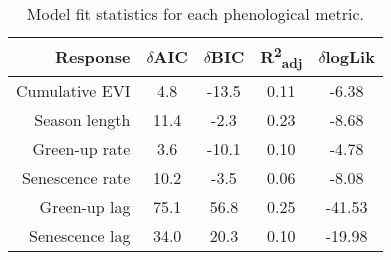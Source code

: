 \begin{table}[h]
\centering
\begin{tabular}{rcccc}
  \hline
Response & $\delta$AIC & $\delta$BIC & R\textsuperscript{2}\textsubscript{adj} & $\delta$logLik \\ 
  \hline
Cumulative EVI & 4.8 & -13.5 & 0.11 & -6.38 \\ 
  Season length & 11.4 & -2.3 & 0.23 & -8.68 \\ 
  Green-up rate & 3.6 & -10.1 & 0.10 & -4.78 \\ 
  Senescence rate & 10.2 & -3.5 & 0.06 & -8.08 \\ 
  Green-up lag & 75.1 & 56.8 & 0.25 & -41.53 \\ 
  Senescence lag & 34.0 & 20.3 & 0.10 & -19.98 \\ 
   \hline
\end{tabular}
\caption{Model fit statistics for each phenological metric.} 
\label{mod_stat}
\end{table}

